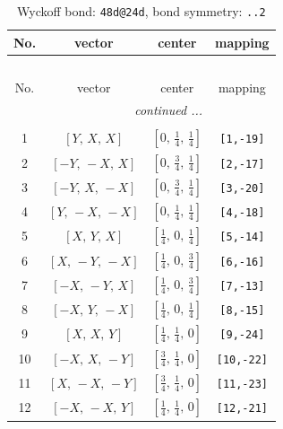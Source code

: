 \documentclass[fleqn,8pt]{jsarticle}
\begin{document}
\begin{longtable}{cccc}
\caption{Wyckoff bond: {\tt 48d@24d}, bond symmetry: {\tt ..2}}
 \\
 \hline \hline
No. & vector & center & mapping \\ \hline \endfirsthead

\multicolumn{3}{l}{\tablename\ \thetable{}} \\
 \hline \hline
No. & vector & center & mapping \\ \hline \endhead

 \hline \hline
\multicolumn{3}{r}{\footnotesize\it continued ...} \\ \endfoot

 \hline \hline
\multicolumn{3}{r}{} \\ \endlastfoot

1 & $\left[ Y,\, X,\, X \right]$ & $\left[ 0,\, \frac{1}{4},\, \frac{1}{4} \right]$ & {\tt [1,-19]} \\ \hline
2 & $\left[ - Y,\, - X,\, X \right]$ & $\left[ 0,\, \frac{3}{4},\, \frac{1}{4} \right]$ & {\tt [2,-17]} \\ \hline
3 & $\left[ - Y,\, X,\, - X \right]$ & $\left[ 0,\, \frac{3}{4},\, \frac{1}{4} \right]$ & {\tt [3,-20]} \\ \hline
4 & $\left[ Y,\, - X,\, - X \right]$ & $\left[ 0,\, \frac{1}{4},\, \frac{1}{4} \right]$ & {\tt [4,-18]} \\ \hline
5 & $\left[ X,\, Y,\, X \right]$ & $\left[ \frac{1}{4},\, 0,\, \frac{1}{4} \right]$ & {\tt [5,-14]} \\ \hline
6 & $\left[ X,\, - Y,\, - X \right]$ & $\left[ \frac{1}{4},\, 0,\, \frac{3}{4} \right]$ & {\tt [6,-16]} \\ \hline
7 & $\left[ - X,\, - Y,\, X \right]$ & $\left[ \frac{1}{4},\, 0,\, \frac{3}{4} \right]$ & {\tt [7,-13]} \\ \hline
8 & $\left[ - X,\, Y,\, - X \right]$ & $\left[ \frac{1}{4},\, 0,\, \frac{1}{4} \right]$ & {\tt [8,-15]} \\ \hline
9 & $\left[ X,\, X,\, Y \right]$ & $\left[ \frac{1}{4},\, \frac{1}{4},\, 0 \right]$ & {\tt [9,-24]} \\ \hline
10 & $\left[ - X,\, X,\, - Y \right]$ & $\left[ \frac{3}{4},\, \frac{1}{4},\, 0 \right]$ & {\tt [10,-22]} \\ \hline
11 & $\left[ X,\, - X,\, - Y \right]$ & $\left[ \frac{3}{4},\, \frac{1}{4},\, 0 \right]$ & {\tt [11,-23]} \\ \hline
12 & $\left[ - X,\, - X,\, Y \right]$ & $\left[ \frac{1}{4},\, \frac{1}{4},\, 0 \right]$ & {\tt [12,-21]} \\
\end{longtable}
\end{document}
